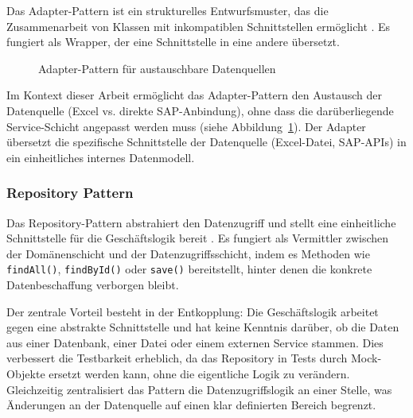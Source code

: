 Das Adapter-Pattern ist ein strukturelles Entwurfsmuster, das die Zusammenarbeit von Klassen mit inkompatiblen Schnittstellen ermöglicht \citep{gamma1994}. Es fungiert als Wrapper, der eine Schnittstelle in eine andere übersetzt.

\begin{figure}[H]
\centering
{}
\caption{Adapter-Pattern für austauschbare Datenquellen}
\label{fig:adapter-pattern}
\end{figure}

Im Kontext dieser Arbeit ermöglicht das Adapter-Pattern den Austausch der Datenquelle (Excel vs. direkte SAP-Anbindung), ohne dass die darüberliegende Service-Schicht angepasst werden muss (siehe Abbildung~\ref{fig:adapter-pattern}). Der Adapter übersetzt die spezifische Schnittstelle der Datenquelle (Excel-Datei, SAP-APIs) in ein einheitliches internes Datenmodell.

\subsubsection{Repository Pattern}

Das Repository-Pattern abstrahiert den Datenzugriff und stellt eine einheitliche Schnittstelle für die Geschäftslogik bereit \citep{fowler2002}. Es fungiert als Vermittler zwischen der Domänenschicht und der Datenzugriffsschicht, indem es Methoden wie \texttt{findAll()}, \texttt{findById()} oder \texttt{save()} bereitstellt, hinter denen die konkrete Datenbeschaffung verborgen bleibt.

Der zentrale Vorteil besteht in der Entkopplung: Die Geschäftslogik arbeitet gegen eine abstrakte Schnittstelle und hat keine Kenntnis darüber, ob die Daten aus einer Datenbank, einer Datei oder einem externen Service stammen. Dies verbessert die Testbarkeit erheblich, da das Repository in Tests durch Mock-Objekte ersetzt werden kann, ohne die eigentliche Logik zu verändern. Gleichzeitig zentralisiert das Pattern die Datenzugriffslogik an einer Stelle, was Änderungen an der Datenquelle auf einen klar definierten Bereich begrenzt.

